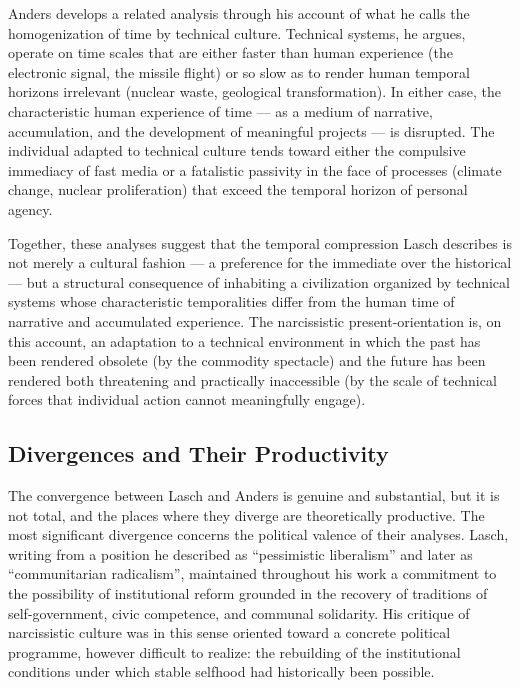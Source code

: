 \documentclass[12pt]{memoir}
\begin{document}
Anders develops a related analysis through his account of what he calls the homogenization of
time by technical culture. Technical systems, he argues, operate on time scales that are either
faster than human experience (the electronic signal, the missile flight) or so slow as to
render human temporal horizons irrelevant (nuclear waste, geological transformation). In either
case, the characteristic human experience of time — as a medium of narrative, accumulation,
and the development of meaningful projects — is disrupted. The individual adapted to technical
culture tends toward either the compulsive immediacy of fast media or a fatalistic passivity in
the face of processes (climate change, nuclear proliferation) that exceed the temporal horizon
of personal agency.\citep[270--285]{anders1980}

Together, these analyses suggest that the temporal compression Lasch describes is not merely a
cultural fashion — a preference for the immediate over the historical — but a structural
consequence of inhabiting a civilization organized by technical systems whose characteristic
temporalities differ from the human time of narrative and accumulated experience. The
narcissistic present-orientation is, on this account, an adaptation to a technical environment
in which the past has been rendered obsolete (by the commodity spectacle) and the future has
been rendered both threatening and practically inaccessible (by the scale of technical forces
that individual action cannot meaningfully engage).

\subsection{Divergences and Their Productivity}

The convergence between Lasch and Anders is genuine and substantial, but it is not total, and
the places where they diverge are theoretically productive. The most significant divergence
concerns the political valence of their analyses. Lasch, writing from a position he described
as \enquote{pessimistic liberalism} and later as \enquote{communitarian radicalism}, maintained
throughout his work a commitment to the possibility of institutional reform grounded in the
recovery of traditions of self-government, civic competence, and communal solidarity. His
critique of narcissistic culture was in this sense oriented toward a concrete political
programme, however difficult to realize: the rebuilding of the institutional conditions under
which stable selfhood had historically been possible.
\end{document}
